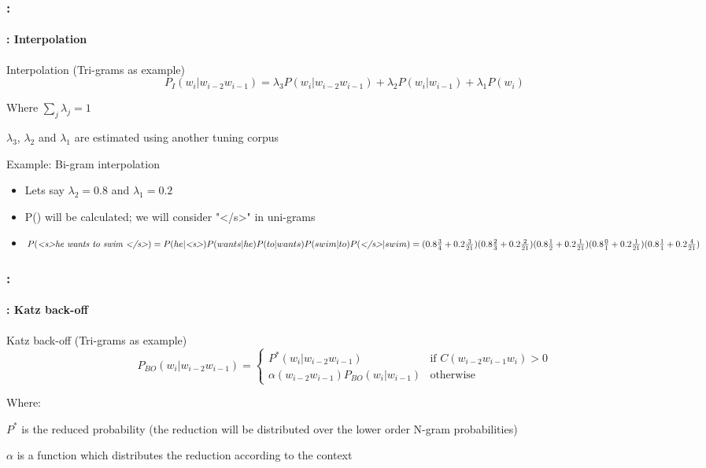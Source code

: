 \documentclass[xcolor=table]{beamer}
\begin{document}
\begin{frame}
	\frametitle{\insertshortsubtitle: \insertsection}
	\framesubtitle{\insertsubsection: Interpolation}

	\begin{block}{Interpolation (Tri-grams as example)}
		\[%
		P_{I}(w_i | w_{i-2} w_{i-1}) = 
		\lambda_3 P(w_i | w_{i-2} w_{i-1}) 
		+ \lambda_2 P(w_i | w_{i-1}) 
		+ \lambda_1 P(w_i) 
		\]
		
		Where $\sum_j \lambda_j = 1$
		
		$\lambda_3$, $\lambda_2$ and $\lambda_1$ are estimated using another tuning corpus
	\end{block}
	
	\begin{exampleblock}{Example: Bi-gram interpolation}
		\begin{itemize}
			\item Lets say $\lambda_2=0.8$ and $\lambda_1=0.2$
			\item P() will be calculated; we will consider "\textless/s\textgreater" in uni-grams
			\item $P(\text{\textit{\textless s\textgreater he wants to swim \textless/s\textgreater}}) = 
			P(he|\text{\textit{\textless s\textgreater}}) P(wants|he) P(to|wants) P(swim|to) P(\text{\textit{\textless/s\textgreater}}|swim) = 
			(0.8\frac{3}{4} + 0.2\frac{3}{21}) (0.8\frac{2}{3} + 0.2\frac{2}{21}) (0.8\frac{1}{2} + 0.2\frac{1}{21}) (0.8\frac{0}{1} + 0.2\frac{1}{21}) (0.8\frac{1}{1} + 0.2\frac{4}{21})$
		\end{itemize}
	\end{exampleblock}

\end{frame}

\begin{frame}
	\frametitle{\insertshortsubtitle: \insertsection}
	\framesubtitle{\insertsubsection: Katz back-off}

	\begin{block}{Katz back-off (Tri-grams as example)}
		\[%
		P_{BO}(w_i | w_{i-2} w_{i-1}) = 
		\begin{cases}
		P^*(w_i | w_{i-2} w_{i-1}) & \text{if } C(w_{i-2} w_{i-1} w_i) > 0 \\
		\alpha(w_{i-2} w_{i-1}) P_{BO}(w_i | w_{i-1}) & \text{otherwise}
		\end{cases}
		\]
		
		Where: 
		
		$P^*$ is the reduced probability (the reduction will be distributed over the lower order N-gram probabilities)
		
		$\alpha$ is a function which distributes the reduction according to the context
	\end{block}

\end{frame}
\end{document}
